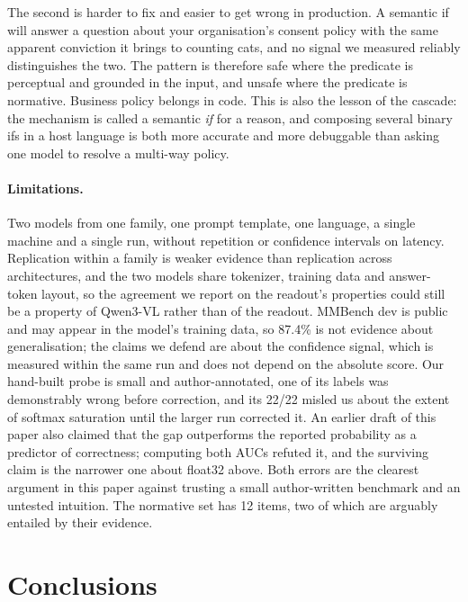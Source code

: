 \documentclass[10pt,twocolumn]{article}
\begin{document}
The second is harder to fix and easier to get wrong in production. A semantic
if will answer a question about your organisation's consent policy with the
same apparent conviction it brings to counting cats, and no signal we measured
reliably distinguishes the two. The pattern is therefore safe where the
predicate is perceptual and grounded in the input, and unsafe where the
predicate is normative. Business policy belongs in code. This is also the
lesson of the cascade: the mechanism is called a semantic \emph{if} for a
reason, and composing several binary ifs in a host language is both more
accurate and more debuggable than asking one model to resolve a multi-way
policy.

\paragraph{Limitations.} Two models from one family, one prompt template, one
language, a single machine and a single run, without repetition or confidence
intervals on latency. Replication within a family is weaker evidence than
replication across architectures, and the two models share tokenizer, training
data and answer-token layout, so the agreement we report on the readout's
properties could still be a property of Qwen3-VL rather than of the readout. MMBench dev is public and may appear in the model's training data, so
87.4\% is not evidence about generalisation; the claims we defend are about the
confidence signal, which is measured within the same run and does not depend on
the absolute score. Our hand-built probe is small and author-annotated, one of
its labels was demonstrably wrong before correction, and its 22/22 misled us
about the extent of softmax saturation until the larger run corrected it. An
earlier draft of this paper also claimed that the gap outperforms the reported
probability as a predictor of correctness; computing both AUCs refuted it, and
the surviving claim is the narrower one about float32 above. Both errors are
the clearest argument in this paper against trusting a small author-written
benchmark and an untested intuition. The normative set has 12 items, two of which are
arguably entailed by their evidence.

\section{Conclusions}
\end{document}
